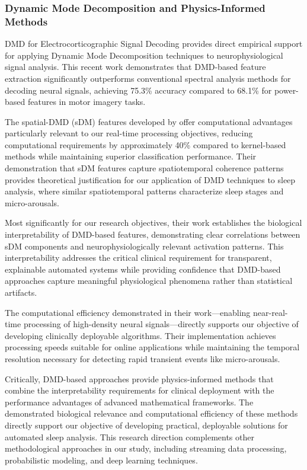 \documentclass[a4paper,12pt,twoside]{article}
\begin{document}
\subsubsection{Dynamic Mode Decomposition and Physics-Informed Methods}

DMD for Electrocorticographic Signal Decoding \cite{Yanagisawa2024} provides direct empirical support for applying Dynamic Mode Decomposition techniques to neurophysiological signal analysis. This recent work demonstrates that DMD-based feature extraction significantly outperforms conventional spectral analysis methods for decoding neural signals, achieving 75.3\% accuracy compared to 68.1\% for power-based features in motor imagery tasks.

The spatial-DMD (sDM) features developed by \citeauthor{Yanagisawa2024} offer computational advantages particularly relevant to our real-time processing objectives, reducing computational requirements by approximately 40\% compared to kernel-based methods while maintaining superior classification performance. Their demonstration that sDM features capture spatiotemporal coherence patterns provides theoretical justification for our application of DMD techniques to sleep analysis, where similar spatiotemporal patterns characterize sleep stages and micro-arousals.

Most significantly for our research objectives, their work establishes the biological interpretability of DMD-based features, demonstrating clear correlations between sDM components and neurophysiologically relevant activation patterns. This interpretability addresses the critical clinical requirement for transparent, explainable automated systems while providing confidence that DMD-based approaches capture meaningful physiological phenomena rather than statistical artifacts.

The computational efficiency demonstrated in their work—enabling near-real-time processing of high-density neural signals—directly supports our objective of developing clinically deployable algorithms. Their implementation achieves processing speeds suitable for online applications while maintaining the temporal resolution necessary for detecting rapid transient events like micro-arousals.

Critically, DMD-based approaches provide physics-informed methods that combine the interpretability requirements for clinical deployment with the performance advantages of advanced mathematical frameworks. The demonstrated biological relevance and computational efficiency of these methods directly support our objective of developing practical, deployable solutions for automated sleep analysis. This research direction complements other methodological approaches in our study, including streaming data processing, probabilistic modeling, and deep learning techniques.
\end{document}
